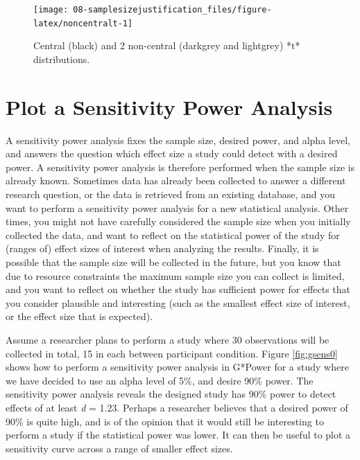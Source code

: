 \documentclass[
  oneside]{book}
\begin{document}
\begin{figure}

{\centering \texttt{[image: 08-samplesizejustification\_files/figure-latex/noncentralt-1]} 

}

\caption{Central (black) and 2 non-central (darkgrey and lightgrey) *t* distributions.}\label{fig:noncentralt}
\end{figure}

\hypertarget{plot-a-sensitivity-power-analysis}{%
\section{Plot a Sensitivity Power Analysis}\label{plot-a-sensitivity-power-analysis}}

A sensitivity power analysis fixes the sample size, desired power, and alpha level, and answers the question which effect size a study could detect with a desired power. A sensitivity power analysis is therefore performed when the sample size is already known. Sometimes data has already been collected to answer a different research question, or the data is retrieved from an existing database, and you want to perform a sensitivity power analysis for a new statistical analysis. Other times, you might not have carefully considered the sample size when you initially collected the data, and want to reflect on the statistical power of the study for (ranges of) effect sizes of interest when analyzing the results. Finally, it is possible that the sample size will be collected in the future, but you know that due to resource constraints the maximum sample size you can collect is limited, and you want to reflect on whether the study has sufficient power for effects that you consider plausible and interesting (such as the smallest effect size of interest, or the effect size that is expected).

Assume a researcher plans to perform a study where 30 observations will be collected in total, 15 in each between participant condition. Figure \ref{fig:gsens0} shows how to perform a sensitivity power analysis in G*Power for a study where we have decided to use an alpha level of 5\%, and desire 90\% power. The sensitivity power analysis reveals the designed study has 90\% power to detect effects of at least \emph{d} = 1.23. Perhaps a researcher believes that a desired power of 90\% is quite high, and is of the opinion that it would still be interesting to perform a study if the statistical power was lower. It can then be useful to plot a sensitivity curve across a range of smaller effect sizes.
\end{document}
